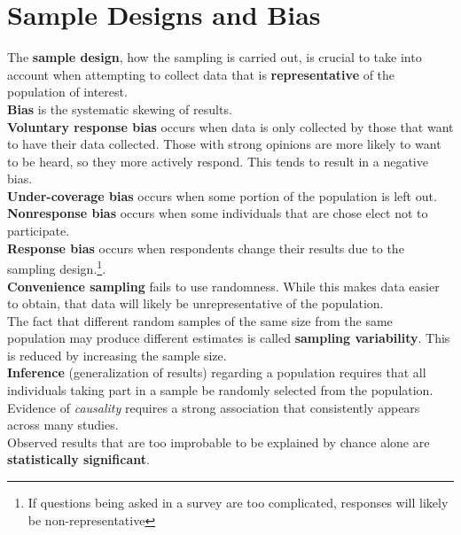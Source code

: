 \documentclass[../AP_Statistics.tex]{subfiles}
\begin{document}
		\section*{Sample Designs and Bias}
		The \textbf{sample design}, how the sampling is carried out, is crucial to take into account when attempting to collect data that is \textbf{representative} of the population of interest. \\
		\textbf{Bias} is the systematic skewing of results. \\
		\textbf{Voluntary response bias} occurs when data is only collected by those that want to have their data collected. Those with strong opinions are more likely to want to be heard, so they more actively respond. This tends to result in a negative bias. \\
		\textbf{Under-coverage bias} occurs when some portion of the population is left out. \\
		\textbf{Nonresponse bias} occurs when some individuals that are chose elect not to participate. \\
		\textbf{Response bias} occurs when respondents change their results due to the sampling design.\footnote{If questions being asked in a survey are too complicated, responses will likely be non-representative}. \\
		\textbf{Convenience sampling} fails to use randomness. While this makes data easier to obtain, that data will likely be unrepresentative of the population. \\
		The fact that different random samples of the same size from the same population may produce different estimates is called \textbf{sampling variability}. This is reduced by increasing the sample size. \\
		\textbf{Inference} (generalization of results) regarding a population requires that all individuals taking part in a sample be randomly selected from the population. \\
		Evidence of \emph{causality} requires a strong association that consistently appears across many studies. \\
		Observed results that are too improbable to be explained by chance alone are \textbf{statistically significant}.
\end{document}
